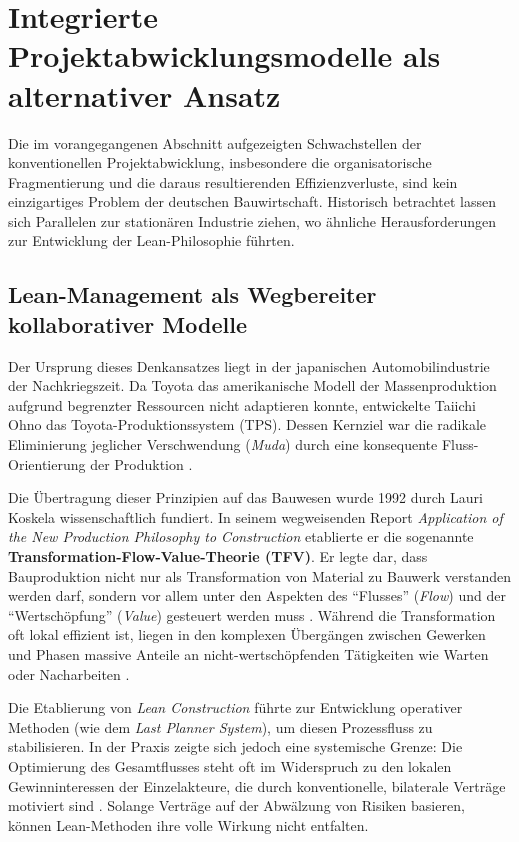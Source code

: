 \clearpage

\section{Integrierte Projektabwicklungsmodelle als alternativer Ansatz}
\label{sec:2.2}

Die im vorangegangenen Abschnitt aufgezeigten Schwachstellen der konventionellen Projektabwicklung, insbesondere die organisatorische Fragmentierung und die daraus resultierenden Effizienzverluste, sind kein einzigartiges Problem der deutschen Bauwirtschaft. Historisch betrachtet lassen sich Parallelen zur stationären Industrie ziehen, wo ähnliche Herausforderungen zur Entwicklung der Lean-Philosophie führten.

\subsection{Lean-Management als Wegbereiter kollaborativer Modelle}
\label{sec:2.2.1}

Der Ursprung dieses Denkansatzes liegt in der japanischen Automobilindustrie der Nachkriegszeit. Da Toyota das amerikanische Modell der Massenproduktion aufgrund begrenzter Ressourcen nicht adaptieren konnte, entwickelte Taiichi Ohno das Toyota-Produktionssystem (TPS). Dessen Kernziel war die radikale Eliminierung jeglicher Verschwendung (\textit{Muda}) durch eine konsequente Fluss-Orientierung der Produktion \autocite[Vgl.][S.~33]{ohno_toyota-produktionssystem_2013}.

Die Übertragung dieser Prinzipien auf das Bauwesen wurde 1992 durch Lauri Koskela wissenschaftlich fundiert. In seinem wegweisenden Report \textit{Application of the New Production Philosophy to Construction} etablierte er die sogenannte \textbf{Transformation-Flow-Value-Theorie (TFV)}. Er legte dar, dass Bauproduktion nicht nur als Transformation von Material zu Bauwerk verstanden werden darf, sondern vor allem unter den Aspekten des \enquote{Flusses} (\textit{Flow}) und der \enquote{Wertschöpfung} (\textit{Value}) gesteuert werden muss \autocite[Vgl.][S.~15]{koskela_application_1992}. Während die Transformation oft lokal effizient ist, liegen in den komplexen Übergängen zwischen Gewerken und Phasen massive Anteile an nicht-wertschöpfenden Tätigkeiten wie Warten oder Nacharbeiten \autocite[Vgl.][S.~16]{haghsheno_lean_2019}.

Die Etablierung von \textit{Lean Construction} führte zur Entwicklung operativer Methoden (wie dem \textit{Last Planner System}), um diesen Prozessfluss zu stabilisieren. In der Praxis zeigte sich jedoch eine systemische Grenze: Die Optimierung des Gesamtflusses steht oft im Widerspruch zu den lokalen Gewinninteressen der Einzelakteure, die durch konventionelle, bilaterale Verträge motiviert sind \autocite[Vgl.][S.~12]{becker_integrierte_2022}. Solange Verträge auf der Abwälzung von Risiken basieren, können Lean-Methoden ihre volle Wirkung nicht entfalten.

